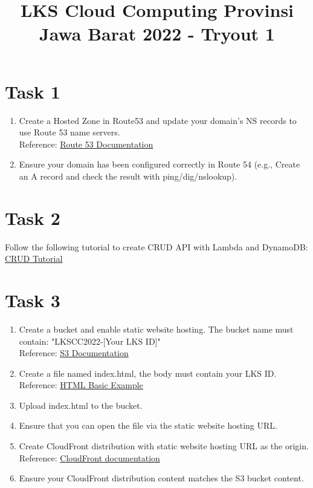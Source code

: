 \documentclass{article}
\title{LKS Cloud Computing Provinsi Jawa Barat 2022 - Tryout 1}
\author{}
\begin{document}
\maketitle

\section*{Task 1}
\begin{enumerate}
\item Create a Hosted Zone in Route53 and update your domain's NS records to use Route 53 name servers.\\
Reference: \href{https://docs.aws.amazon.com/Route53/latest/DeveloperGuide/Welcome.html}{Route 53 Documentation}
\item Ensure your domain has been configured correctly in Route 54 (e.g., Create an A record and check the result with ping/dig/nslookup).
\end{enumerate}

\section*{Task 2}
Follow the following tutorial to create CRUD API with Lambda and DynamoDB:
\href{https://docs.aws.amazon.com/apigateway/latest/developerguide/http-api-dynamo-db.html}{CRUD Tutorial}

\section*{Task 3}
\begin{enumerate}
\item Create a bucket and enable static website hosting. The bucket name must contain: "LKSCC2022-[Your LKS ID]"\\
Reference: \href{https://docs.aws.amazon.com/AmazonS3/latest/userguide/Welcome.html}{S3 Documentation}
\item Create a file named index.html, the body must contain your LKS ID.\\
Reference: \href{https://www.w3schools.com/html/html_basic.asp}{HTML Basic Example} 
\item Upload index.html to the bucket.
\item Ensure that you can open the file via the static website hosting URL.
\item Create CloudFront distribution with static website hosting URL as the origin.\\
Reference: \href{https://docs.aws.amazon.com/AmazonCloudFront/latest/DeveloperGuide/Introduction.html}{CloudFront documentation}
\item Ensure your CloudFront distribution content matches the S3 bucket content.
\end{enumerate}
\end{document}
